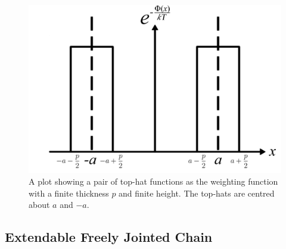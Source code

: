 \begin{figure}[htp]
 \centering \includegraphics[scale=0.6]{Graphics/DoubleTopHatFunction.png} 
\caption{A plot showing a pair of top-hat functions as the weighting function with
a finite thickness $p$ and finite height. The top-hats are centred about $a$ and $-a$.}
\label{fig:DoubleTophatPotential} 
\end{figure}

\subsection{Extendable Freely Jointed Chain}

